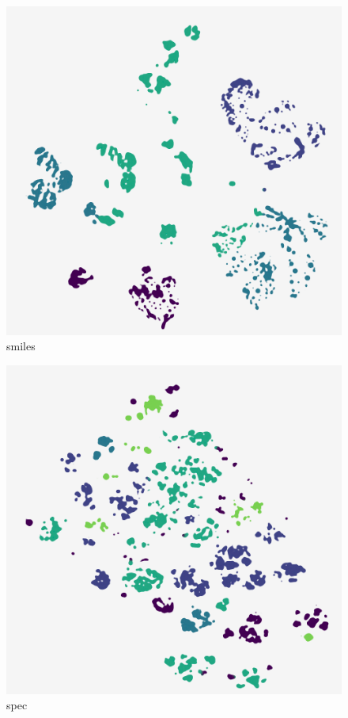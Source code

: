 \begin{subfigure}[b]{.25\linewidth}
    \centering
    \includegraphics[width=\textwidth]{outputs/DRplots/plots/t-SNE_smiles.png}
    \caption{smiles}
    \label{fig:t-SNE_smiles}
\end{subfigure}
\begin{subfigure}[b]{.25\linewidth}
    \centering
    \includegraphics[width=\textwidth]{outputs/DRplots/plots/t-SNE_spec.png}
    \caption{spec}
    \label{fig:t-SNE_spec}
\end{subfigure}